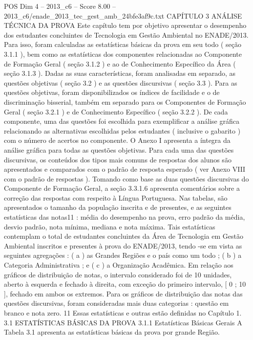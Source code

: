 \begin{textsample}{POS Dim 4 – 2013\_c6 – Score 8.00 – 2013\_c6/enade\_2013\_tec\_gest\_amb\_24bfe3af9c.txt}  \label{ex:f4_pos_046}
CAPÍTULO 3 ANÁLISE TÉCNICA DA PROVA Este capítulo tem por objetivo apresentar o desempenho dos estudantes concluintes de Tecnologia em Gestão Ambiental no ENADE/2013.
Para isso, foram calculadas as estatísticas básicas da prova em seu todo ( seção 3.1.1 ), bem como as estatísticas dos componentes relacionadas ao Componente de Formação Geral ( seção 3.1.2 ) e ao de Conhecimento Específico da Área ( seção 3.1.3 ).
Dadas as suas características, foram analisadas em separado, as questões objetivas ( seção 3.2 ) e as questões discursivas ( seção 3.3 ).
Para as questões objetivas, foram disponibilizados os índices de facilidade e o de discriminação bisserial, também em separado para os Componentes de Formação Geral ( seção 3.2.1 ) e de Conhecimento Específico ( seção 3.2.2 ).
De cada componente, uma das questões foi escolhida para exemplificar a análise gráfica relacionando as alternativas escolhidas pelos estudantes ( inclusive o gabarito ) com o número de acertos no componente.
O Anexo I apresenta a íntegra da análise gráfica para todas as questões objetivas.
Para cada uma das questões discursivas, os conteúdos dos tipos mais comuns de respostas dos alunos são apresentados e comparados com o padrão de resposta esperado ( ver Anexo VIII com o padrão de respostas ).
Tomando como base as duas questões discursivas do Componente de Formação Geral, a seção 3.3.1.6 apresenta comentários sobre a correção das respostas com respeito à Língua Portuguesa.
Nas tabelas, são apresentados o tamanho da população inscrita e de presentes, e as seguintes estatísticas das notas11 : média do desempenho na prova, erro padrão da média, desvio padrão, nota mínima, mediana e nota máxima.
Tais estatísticas contemplam o total de estudantes concluintes da Área de Tecnologia em Gestão Ambiental inscritos e presentes à prova do ENADE/2013, tendo -se em vista as seguintes agregações : ( a ) as Grandes Regiões e o país como um todo ; ( b ) a Categoria Administrativa ; e ( c ) a Organização Acadêmica.
Em relação aos gráficos de distribuição de notas, o intervalo considerado foi de 10 unidades, aberto à esquerda e fechado à direita, com exceção do primeiro intervalo, [ 0 ; 10 ], fechado em ambos os extremos.
Para os gráficos de distribuição das notas das questões discursivas, foram consideradas mais duas categorias : questão em branco e nota zero. 11 Essas estatísticas e outras estão definidas no Capítulo 1. 3.1 ESTATÍSTICAS BÁSICAS DA PROVA 3.1.1 Estatísticas Básicas Gerais A Tabela 3.1 apresenta as estatísticas básicas da prova por grande Região.

\end{textsample}
